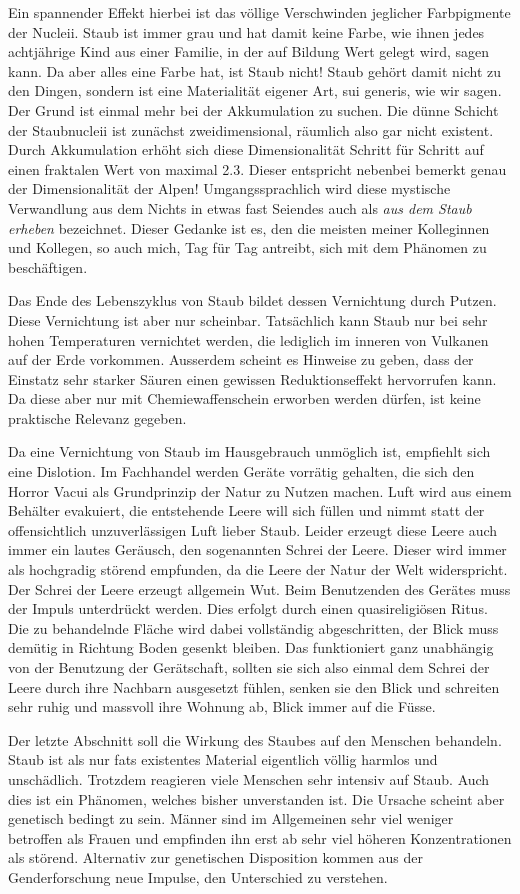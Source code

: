 Ein spannender Effekt hierbei ist das völlige Verschwinden jeglicher Farbpigmente der Nucleii. Staub ist immer grau und hat damit keine Farbe, wie ihnen jedes achtjährige Kind aus einer Familie, in der auf Bildung Wert gelegt wird, sagen kann. Da aber alles eine Farbe hat, ist Staub nicht! Staub gehört damit nicht zu den Dingen, sondern ist eine Materialität eigener Art, sui generis, wie wir sagen. Der Grund ist einmal mehr bei der Akkumulation zu suchen. Die dünne Schicht der Staubnucleii ist zunächst zweidimensional, räumlich also gar nicht existent. Durch Akkumulation erhöht sich diese Dimensionalität Schritt für Schritt auf einen fraktalen Wert von maximal 2.3. Dieser entspricht nebenbei bemerkt genau der Dimensionalität der Alpen! Umgangssprachlich wird diese mystische Verwandlung aus dem Nichts in etwas fast Seiendes auch als \textit{aus dem Staub erheben} bezeichnet. Dieser Gedanke ist es, den die meisten meiner Kolleginnen und Kollegen, so auch mich, Tag für Tag antreibt, sich mit dem Phänomen zu beschäftigen.

Das Ende des Lebenszyklus von Staub bildet dessen Vernichtung durch Putzen. Diese Vernichtung ist aber nur scheinbar. Tatsächlich kann Staub nur bei sehr hohen Temperaturen vernichtet werden, die lediglich im inneren von Vulkanen auf der Erde vorkommen. Ausserdem scheint es Hinweise zu geben, dass der Einstatz sehr starker Säuren einen gewissen Reduktionseffekt hervorrufen kann. Da diese aber nur mit Chemiewaffenschein erworben werden dürfen, ist keine praktische Relevanz gegeben.

Da eine Vernichtung von Staub im Hausgebrauch unmöglich ist, empfiehlt sich eine Dislotion. Im Fachhandel werden Geräte vorrätig gehalten, die sich den Horror Vacui als Grundprinzip der Natur zu Nutzen machen. Luft wird aus einem Behälter evakuiert, die entstehende Leere will sich füllen und nimmt statt der offensichtlich unzuverlässigen Luft lieber Staub. Leider erzeugt diese Leere auch immer ein lautes Geräusch, den sogenannten Schrei der Leere. Dieser wird immer als hochgradig störend empfunden, da die Leere der Natur der Welt widerspricht. Der Schrei der Leere erzeugt allgemein Wut. Beim Benutzenden des Gerätes muss der Impuls unterdrückt werden. Dies erfolgt durch einen quasireligiösen Ritus. Die zu behandelnde Fläche wird dabei vollständig abgeschritten, der Blick muss demütig in Richtung Boden gesenkt bleiben. Das funktioniert ganz unabhängig von der Benutzung der Gerätschaft, sollten sie sich also einmal dem Schrei der Leere durch ihre Nachbarn ausgesetzt fühlen, senken sie den Blick und schreiten sehr ruhig und massvoll ihre Wohnung ab, Blick immer auf die Füsse.

Der letzte Abschnitt soll die Wirkung des Staubes auf den Menschen behandeln. Staub ist als nur fats existentes Material eigentlich völlig harmlos und unschädlich. Trotzdem reagieren viele Menschen sehr intensiv auf Staub. Auch dies ist ein Phänomen, welches bisher unverstanden ist. Die Ursache scheint aber genetisch bedingt zu sein. Männer sind im Allgemeinen sehr viel weniger betroffen als Frauen und empfinden ihn erst ab sehr viel höheren Konzentrationen als störend. Alternativ zur genetischen Disposition kommen aus der Genderforschung neue Impulse, den Unterschied zu verstehen. 
\vfill
